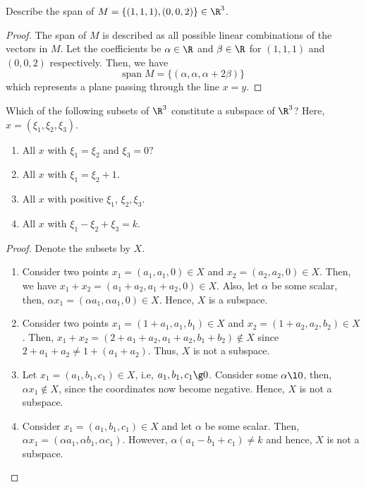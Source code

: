 \begin{question}
    Describe the span of $M = \{(1,1,1) , (0,0,2)\} \in \R^3$.
    \label{section2.1-3}
\end{question}
\begin{proof}
    The span of $M$ is described as all possible linear combinations of the vectors in $M$. Let the coefficients be $\alpha \in \R$ and $\beta \in \R$ for $(1,1,1)$ and $(0,0,2)$ respectively. Then, we have
    \[\textrm{span}\; M = \{(\alpha , \alpha , \alpha + 2\beta)\}\]
    which represents a plane passing through the line $x=y$.
\end{proof}

\begin{question}
    Which of the following subsets of $\R^3$ constitute a subspace of $\R^3$? Here, $x = (\xi_1 ,\xi_2 , \xi_3)$.
    \begin{enumerate}
        \item All $x$ with $\xi_1 = \xi_2$ and $\xi_3 = 0$?
        \item All $x$ with $\xi_1 = \xi_2 + 1$.
        \item All $x$ with positive $\xi_1$, $\xi_2,\xi_3$.
        \item All $x$ with $\xi_1 - \xi_2 + \xi_3 = k$.
    \end{enumerate}
    \label{section2.1-4}
\end{question}
\begin{proof}
    Denote the subsets by $X$.
    \begin{enumerate}
        \item Consider two points $x_1 = (a_1,a_1,0) \in X$ and $x_2 = (a_2,a_2,0) \in X$. Then, we have $x_1 + x_2 = (a_1 + a_2 , a_1 + a_2 , 0) \in X$. Also, let $\alpha$ be some scalar, then, $\alpha x_1 = (\alpha a_1 , \alpha a_1 , 0) \in X$. Hence, $X$ is a subspace.
        \item Consider two points $x_1 = (1 + a_1 , a_1 , b_1) \in X$ and $x_2 = (1 + a_2 , a_2 , b_2) \in X$. Then, $x_1 + x_2 = (2 + a_1 + a_2 , a_1 + a_2 , b_1 + b_2) \notin X$ since $2 + a_1 + a_2 \neq 1 + (a_1 + a_2)$. Thus, $X$ is not a subspace.
        \item Let $x_1 = (a_1 , b_1 , c_1) \in X$, i.e, $a_1 , b_1 , c_1 \g 0$. Consider some $\alpha \l 0$, then, $\alpha x_1 \notin X$, since the coordinates now become negative. Hence, $X$ is not a subspace.
        \item Consider $x_1 = (a_1 , b_1 , c_1) \in X$ and let $\alpha$ be some scalar. Then, $\alpha x_1 = (\alpha a_1 , \alpha b_1 , \alpha c_1)$. However, $\alpha(a_1 -b_1 + c_1) \neq k$ and hence, $X$ is not a subspace.
    \end{enumerate}
\end{proof}

